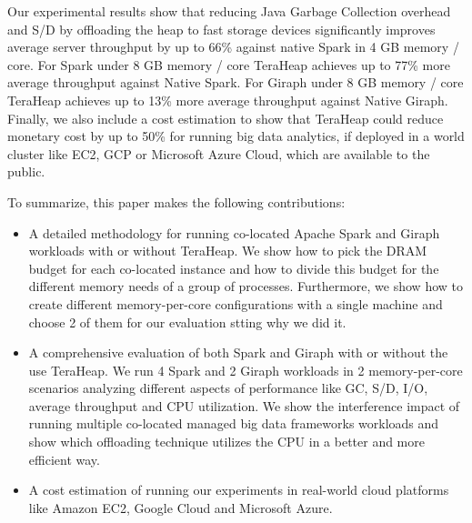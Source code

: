 Our experimental results show that reducing Java Garbage Collection
overhead and S/D by offloading the heap to fast storage devices significantly
improves average server throughput by up to 66\% against native Spark in 4 GB memory / core. 
For Spark under 8 GB memory / core TeraHeap achieves up to 77\% more average throughput against Native Spark.
For Giraph under 8 GB memory / core TeraHeap achieves up to 13\% more average throughput against Native Giraph.
Finally, we also include a cost estimation to show that
TeraHeap could reduce monetary cost by up to 50\% for running big data
analytics, if deployed in a world cluster like EC2, GCP or Microsoft Azure Cloud, which are available to
the public.

To summarize, this paper makes the following contributions: 
\begin{itemize}
    \item{A detailed methodology for running co-located Apache Spark and Giraph
        workloads with or without TeraHeap. 
	We show how to pick the DRAM budget for each co-located instance and how to divide this budget
		for the different memory needs of a group of processes.
		Furthermore, we show how to create different memory-per-core configurations with a single machine and choose
		2 of them for our evaluation stting why we did it.
		}

    \item{A comprehensive evaluation of both Spark and Giraph with or without the use TeraHeap.
	    We run 4 Spark and 2 Giraph workloads in 2 memory-per-core scenarios
	    analyzing different aspects of performance like GC, S/D, I/O, average throughput
		and CPU utilization. We show the interference impact of running multiple co-located managed big data frameworks
		workloads and show which offloading technique utilizes the CPU in a better and more efficient way.}

    \item{A cost estimation of running our experiments in real-world
        cloud platforms like Amazon EC2, Google Cloud and Microsoft
        Azure.}
\end{itemize}
